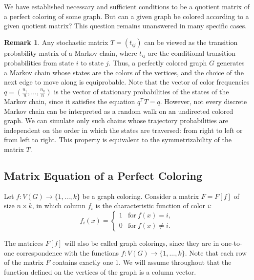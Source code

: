 \documentclass[11pt]{article}
\theoremstyle{definition}
\newtheorem{remark}{Remark}[section]
\begin{document}
We have established necessary and sufficient conditions to be a quotient matrix of a perfect
coloring of some graph. But can a given graph be colored
according to a given quotient matrix? This question remains unanswered in many specific cases.

\begin{remark}
Any stochastic matrix $T=(t_{ij})$ can be viewed as
the transition probability matrix of a Markov chain, where $t_{ij}$ are the conditional transition probabilities from state $i$ to state $j$.
Thus,  a perfectly colored graph
$G$ generates a Markov chain whose states
are the colors of the vertices, and the choice of the next  edge to move  along
is equiprobable. Note that the vector of  color frequencies 
$q=\left(\frac{n_1}{n}, \ldots, \frac{n_k}{n} \right)$ is
the vector of stationary probabilities of the states of the Markov chain,
since it satisfies the equation $q^{\mathsf T}T=q$.
However, not every discrete Markov chain can be interpreted as a random walk on an undirected colored graph. We can simulate only such chains  whose trajectory probabilities  are independent on the order in which the states are traversed: from right to left or from left to right. This property is equivalent to the symmetrizability of the matrix $T$.
\end{remark}

\subsection{Matrix Equation of a Perfect Coloring}

Let $f: V(G) \rightarrow \{1,\ldots,k\}$ be a graph coloring.
Consider a matrix $F=F[f]$ of size $n\times k$, in which column
$f_i$ is the characteristic function of color $i$:
\begin{equation}\label{eq:F}
f_i(x)=\left\{
\begin{array}{ll}
1 & \mbox{for}\ f(x)=i,\\
0 & \mbox{for}\ f(x)\ne i.
\end{array}
\right.
\end{equation}

The matrices $F[f]$ will also be called graph colorings, since
they are in  one-to-one correspondence with the functions $f: V(G) \rightarrow
\{1,\ldots,k\}$.  Note that each row of the matrix $F$ contains
exactly one $1$. We will assume throughout that
the function defined on the vertices of the graph is a column vector.
\end{document}
